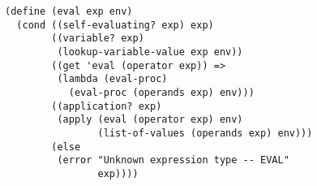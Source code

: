\documentclass[a4paper,12pt]{article}
\begin{document}
\begin{lstlisting}
(define (eval exp env)
  (cond ((self-evaluating? exp) exp)
        ((variable? exp)
         (lookup-variable-value exp env))
        ((get 'eval (operator exp)) =>
         (lambda (eval-proc)
           (eval-proc (operands exp) env)))
        ((application? exp)
         (apply (eval (operator exp) env)
                (list-of-values (operands exp) env)))
        (else
         (error "Unknown expression type -- EVAL"
                exp))))
\end{lstlisting}
\end{document}
